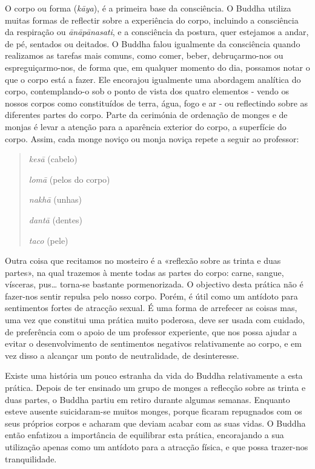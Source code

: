 O corpo ou forma (\emph{kāya}), é a primeira base da consciência. O
Buddha utiliza muitas formas de reflectir sobre a experiência do corpo,
incluindo a consciência da respiração ou \emph{ānāpānasati}, e a
consciência da postura, quer estejamos a andar, de pé, sentados ou
deitados. O Buddha falou igualmente da consciência quando realizamos as
tarefas mais comuns, como comer, beber, debruçarmo-nos ou
espreguiçarmo-nos, de forma que, em qualquer momento do dia, possamos
notar o que o corpo está a fazer. Ele encorajou igualmente uma abordagem
analítica do corpo, contemplando-o sob o ponto de vista dos quatro
elementos - vendo os nossos corpos como constituídos de terra, água,
fogo e ar - ou reflectindo sobre as diferentes partes do corpo. Parte da
cerimónia de ordenação de monges e de monjas é levar a atenção para a
aparência exterior do corpo, a superfície do corpo. Assim, cada monge
noviço ou monja noviça repete a seguir ao professor:

\begin{quote}
  \emph{kesā} (cabelo)

  \emph{lomā} (pelos do corpo)

  \emph{nakhā} (unhas)

  \emph{dantā} (dentes)

  \emph{taco} (pele)
\end{quote}

Outra coisa que recitamos no mosteiro é a «reflexão sobre as trinta e
duas partes», na qual trazemos à mente todas as partes do corpo: carne,
sangue, vísceras, pus\ldots{} torna-se bastante pormenorizada. O
objectivo desta prática não é fazer-nos sentir repulsa pelo nosso corpo.
Porém, é útil como um antídoto para sentimentos fortes de atracção
sexual. É uma forma de arrefecer as coisas mas, uma vez que constitui
uma prática muito poderosa, deve ser usada com cuidado, de preferência
com o apoio de um professor experiente, que nos possa ajudar a evitar o
desenvolvimento de sentimentos negativos relativamente ao corpo, e em
vez disso a alcançar um ponto de neutralidade, de desinteresse.

Existe uma história um pouco estranha da vida do Buddha relativamente a
esta prática. Depois de ter ensinado um grupo de monges a reflecção
sobre as trinta e duas partes, o Buddha partiu em retiro durante algumas
semanas. Enquanto esteve ausente suicidaram-se muitos monges, porque
ficaram repugnados com os seus próprios corpos e acharam que deviam
acabar com as suas vidas. O Buddha então enfatizou a importância de
equilibrar esta prática, encorajando a sua utilização apenas como um
antídoto para a atracção física, e que possa trazer-nos tranquilidade.

